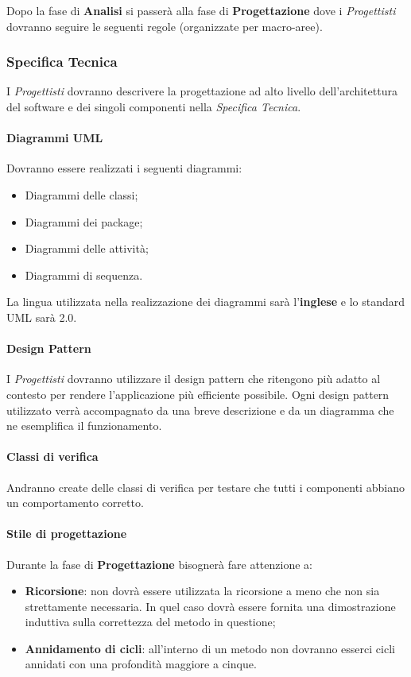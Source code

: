 Dopo la fase di \textbf{Analisi} si passerà alla fase di \textbf{Progettazione} dove i \textit{Progettisti} dovranno seguire le seguenti regole (organizzate per macro-aree).\\
\subsubsection{Specifica Tecnica}
I \textit{Progettisti} dovranno descrivere la progettazione ad alto livello dell'architettura del software e dei singoli componenti nella \textit{Specifica Tecnica}.

\paragraph{Diagrammi UML}
Dovranno essere realizzati i seguenti diagrammi:
\begin{itemize}
	\item Diagrammi delle classi;
	\item Diagrammi dei package;
	\item Diagrammi delle attività;
	\item Diagrammi di sequenza.
\end{itemize}
La lingua utilizzata nella realizzazione dei diagrammi sarà l'\textbf{inglese} e lo standard UML sarà 2.0.

\paragraph{Design Pattern}
I \textit{Progettisti} dovranno utilizzare il design pattern che ritengono più adatto al contesto per rendere l'applicazione più efficiente possibile. Ogni design pattern utilizzato verrà accompagnato da una breve descrizione e da un diagramma che ne esemplifica il funzionamento.

\paragraph{Classi di verifica}
Andranno create delle classi di verifica per testare che tutti i componenti abbiano un comportamento corretto.

\paragraph{Stile di progettazione}
Durante la fase di \textbf{Progettazione} bisognerà fare attenzione a:
\begin{itemize}
	\item \textbf{Ricorsione}: non dovrà essere utilizzata la ricorsione a meno che non sia strettamente necessaria. In quel caso dovrà essere fornita una dimostrazione induttiva sulla correttezza del metodo in questione;
	\item \textbf{Annidamento di cicli}: all'interno di un metodo non dovranno esserci cicli annidati con una profondità maggiore a cinque.
\end{itemize}




